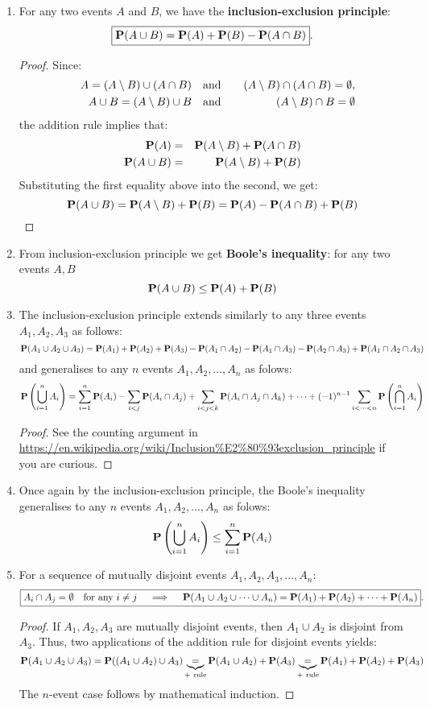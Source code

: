 \begin{enumerate}
\item For any two events $A$ and $B$, we have the {\bf inclusion-exclusion principle}:
\[
\boxed{
\mathbf{P}(A \cup B) = \mathbf{P}(A) + \mathbf{P}(B) - \mathbf{P}(A \cap B)
}.
\]
{\scriptsize
\begin{proof}
Since: 
\begin{eqnarray}
\quad A = (A \setminus B) \cup (A \cap B) & \quad \text{and} \quad & (A \setminus B) \cap (A \cap B) = \emptyset, \notag \\
\quad A \cup B = (A \setminus B) \cup B & \quad \text{and} \quad & (A \setminus B) \cap B = \emptyset \notag
\end{eqnarray}
the addition rule implies that:
\begin{eqnarray}
\mathbf{P}(A) &=& \mathbf{P}(A \setminus B) + \mathbf{P}(A \cap B) \notag \\
\mathbf{P}(A \cup B) &=& \mathbf{P}(A \setminus B) + \mathbf{P}(B) \notag
\end{eqnarray}
Substituting the first equality above into the second, we get:
\[
\mathbf{P}(A \cup B) = \mathbf{P}(A \setminus B) + \mathbf{P}(B) = \mathbf{P}(A) - \mathbf{P}(A \cap B) + \mathbf{P}(B)
\]
\end{proof}
}
\item From inclusion-exclusion principle we get {\bf Boole's inequality}: for any two events $A, B$
\[
\mathbf{P}(A \cup B) \leq \mathbf{P}(A) + \mathbf{P}(B)
\]
\item The inclusion-exclusion principle extends similarly to any three events $A_1,A_2,A_3$ as follows:
\[
\mathbf{P}(A_1 \cup A_2 \cup A_3) = \mathbf{P}(A_1) + \mathbf{P}(A_2) + \mathbf{P}(A_3) - \mathbf{P}(A_1 \cap A_2) - \mathbf{P}(A_1 \cap A_3) - \mathbf{P}(A_2 \cap A_3) + \mathbf{P}(A_1 \cap A_2 \cap A_3)
\]
and generalises to any $n$ events $A_1,A_2,\ldots,A_n$ as folows:
\[
\mathbf{P} \left( \bigcup_{i=1}^n A_i \right) = \sum_{i=1}^n \mathbf{P}(A_i) - \sum_{i<j} \mathbf{P}(A_i \cap A_j) + \sum_{i<j<k} \mathbf{P}(A_i \cap A_j \cap A_k) + \cdots + (-1)^{n-1} \sum_{i< \cdots <n} \mathbf{P} \left( \bigcap_{i=1}^n A_i \right)
\]

{\scriptsize
\begin{proof} See the counting argument in \url{https://en.wikipedia.org/wiki/Inclusion\%E2\%80\%93exclusion_principle} if you are curious.
\end{proof}
}  
\item Once again by the inclusion-exclusion principle, the Boole's inequality generalises to any $n$ events $A_1,A_2,\ldots,A_n$ as folows:
\[
\mathbf{P} \left( \bigcup_{i=1}^n A_i \right) \leq \sum_{i=1}^n \mathbf{P}(A_i)
\]
\item For a sequence of mutually disjoint events $A_1, A_2, A_3, \ldots, A_n$: 
\[
\boxed{
A_i \cap A_j = \emptyset \quad \text{for any $i \neq j$} \quad \implies \quad \mathbf{P}(A_1 \cup A_2 \cup \cdots \cup A_n) = \mathbf{P}(A_1)+\mathbf{P}(A_2)+ \cdots + \mathbf{P}(A_n)} .
\]
{\scriptsize
\begin{proof}
If $A_1, A_2, A_3$ are mutually disjoint events, then $A_1 \cup A_2$ is disjoint from $A_3$.  Thus, two applications of the addition rule for disjoint events yields:
\[
\mathbf{P}(A_1 \cup A_2 \cup A_3) = \mathbf{P}((A_1 \cup A_2) \cup A_3) \underbrace{=}_{+~\text{rule}} \mathbf{P}(A_1 \cup A_2) + \mathbf{P}(A_3) \underbrace{=}_{+~\text{rule}}  \mathbf{P}(A_1) + \mathbf{P}(A_2) + \mathbf{P}(A_3)
\]
The $n$-event case follows by mathematical induction.
\end{proof}
}
\end{enumerate}

